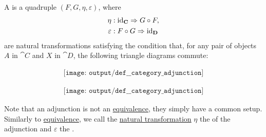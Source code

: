 \begin{definition}
\begin{thmenum}
     A  is a quadruple \( (F, G, \eta, \varepsilon) \), where
    \begin{equation}\label{eq:def:category_adjunction/unit_counit/signature}
      \begin{aligned}
               \eta &: \id_{\cat{C}} \Rightarrow G \bincirc F, \\
        \varepsilon &: F \bincirc G \Rightarrow \id_{\cat{D}}
      \end{aligned}
    \end{equation}
    are natural transformations satisfying the condition that, for any pair of objects \( A \) in \( \cat{C} \) and \( X \) in \( \cat{D} \), the following triangle diagrams commute:

    \begin{minipage}{0.43\textwidth}
      \begin{equation}\label{eq:def:category_adjunction/d_triangle}
        \begin{aligned}
          \texttt{[image: output/def\_\_category\_adjunction]}
        \end{aligned}
      \end{equation}
    \end{minipage}
    \hfill
    \begin{minipage}{0.44\textwidth}
      \raggedright
      \begin{equation}\label{eq:def:category_adjunction/c_triangle}
        \begin{aligned}
          \texttt{[image: output/def\_\_category\_adjunction]}
        \end{aligned}
      \end{equation}
    \end{minipage}
    \smallskip

    Note that an adjunction is not an \hyperref[def:category_equivalence]{equivalence}, they simply have a common setup. Similarly to \hyperref[def:category_equivalence]{equivalence}, we call the \hyperref[def:natural_transformation]{natural transformation} \( \eta \) the  of the adjunction and \( \varepsilon \) the .
  \end{thmenum}
\end{definition}
